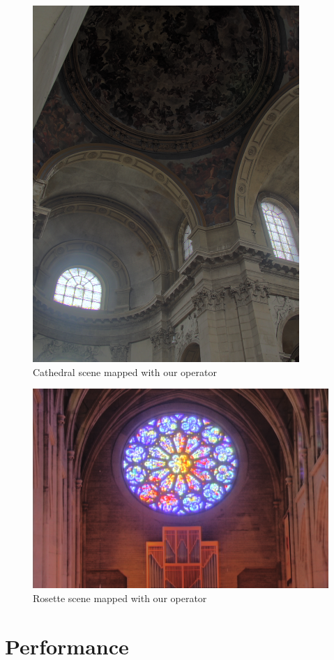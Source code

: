 \documentclass[twocolumn]{article}
\begin{document}
\begin{figure}[h!]
	\centering
	\includegraphics[scale=0.5]{cathedral}
	\caption{Cathedral scene mapped with our operator}
\end{figure}

\begin{figure}[h!]
	\centering
	\includegraphics[scale=0.4]{rosette}
	\caption{Rosette scene mapped with our operator}
\end{figure}

\section{Performance}
\end{document}

